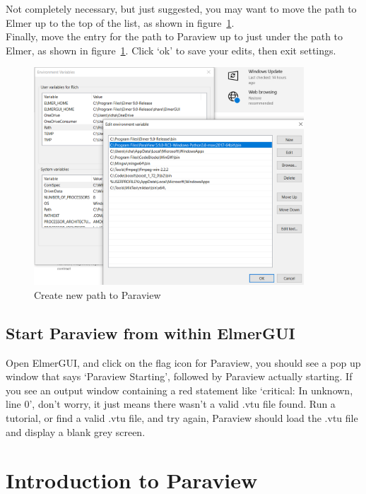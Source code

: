 Not completely necessary, but just suggested, you may want to move the path to 
Elmer up to the top of the list, as shown in figure~\ref{fg:path-5}.\\

Finally, move the entry for the path to Paraview up to just under the path to Elmer, as shown in figure~\ref{fg:path-5}.  Click `ok' to save your edits, then exit settings.

\begin{figure}[H]
\begin{center}
\includegraphics[width=0.9\textwidth]{path-5}
\caption{Create new path to Paraview}\label{fg:path-5}
\end{center}
\end{figure}

\section{Start Paraview from within ElmerGUI}

Open ElmerGUI, and click on the flag icon for Paraview, you should see a pop up window that says `Paraview Starting', followed by Paraview actually starting.  If you see an output window containing a red statement like `critical: In unknown, line 0', don't worry, it just means there wasn't a valid .vtu file found.  Run a tutorial, or find a valid .vtu file, and try again, Paraview should load the .vtu file and display a blank grey screen.

\chapter{Introduction to Paraview}

